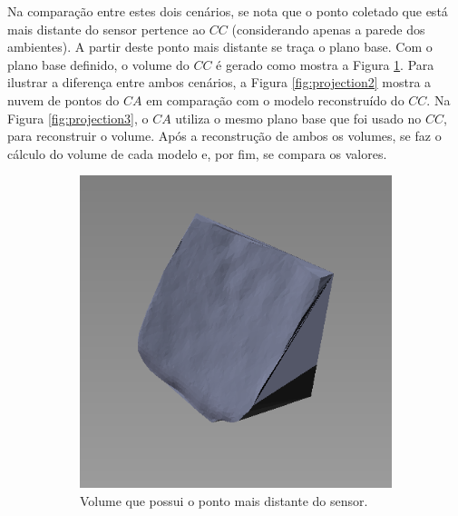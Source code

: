 Na comparação entre estes dois cenários, se nota que o ponto coletado que está mais distante do sensor pertence ao $CC$ (considerando apenas a parede dos ambientes).
A partir deste ponto mais distante se traça o plano base.
Com o plano base definido, o volume do $CC$ é gerado como mostra a Figura \ref{fig:projection1}.
Para ilustrar a diferença entre ambos cenários, a Figura \ref{fig:projection2} mostra a nuvem de pontos do $CA$ em comparação com o modelo reconstruído do $CC$.
Na Figura \ref{fig:projection3}, o $CA$ utiliza o mesmo plano base que foi usado no $CC$, para reconstruir o volume.
Após a reconstrução de ambos os volumes, se faz o cálculo do volume de cada modelo e, por fim, se compara os valores.

\begin{figure}[H]
    \centering
    \begin{subfigure}[t]{0.325\textwidth}
        \includegraphics[width=\textwidth]{dados/figuras/projection1.png}
        \caption{Volume que possui o ponto mais distante do sensor.}
        \label{fig:projection1}
    \end{subfigure}
    \begin{subfigure}[t]{0.325\textwidth}

\end{subfigure}
\end{figure}

